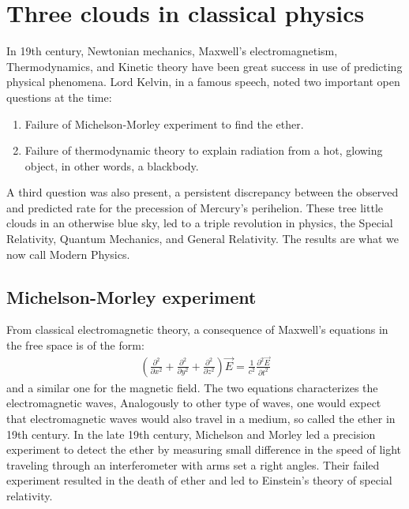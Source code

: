 \documentclass[11pt]{article}
\theoremstyle{break}
\theoremstyle{break}
\begin{document}
\newpage 
\tableofcontents
{}

\newpage
\setcounter{page}{1}
\vspace*{\fill}

\newpage
\section{Three clouds in classical physics}
In 19th century, Newtonian mechanics, Maxwell's electromagnetism, Thermodynamics, and Kinetic theory have been great success in use of predicting physical phenomena. Lord Kelvin, in a famous speech, noted two important open questions at the time:
\begin{enumerate}
\item Failure of Michelson-Morley experiment to find the ether.
\item Failure of thermodynamic theory to explain radiation from a hot, glowing object, in other words, a blackbody.
\end{enumerate}
A third question was also present, a persistent discrepancy between the observed and predicted rate for the precession of Mercury's perihelion. These tree little clouds in an otherwise blue sky, led to a triple revolution in physics, the Special Relativity, Quantum Mechanics, and General Relativity. The results are what we now call Modern Physics. \\

\subsection{Michelson-Morley experiment}
From classical electromagnetic theory, a consequence of Maxwell's equations in the free space is of the form:
\begin{align*}
\left(\frac{\partial^2}{\partial x^2}+ \frac{\partial^2}{\partial y^2}+ \frac{\partial^2}{\partial z^2} \right) \vec{E} = \frac{1}{c^2} \frac{\partial^2\vec{E}}{\partial t^2}
\end{align*}
and a similar one for the magnetic field. The two equations characterizes the electromagnetic waves, Analogously to other type of waves, one would expect that electromagnetic waves would also travel in a medium, so called the ether in 19th century. In the late 19th century, Michelson and Morley led a precision experiment to detect the ether by measuring small difference in the speed of light traveling through an interferometer with arms set a right angles. Their failed experiment resulted in the death of ether and led to Einstein's theory of special relativity. \\
\end{document}
